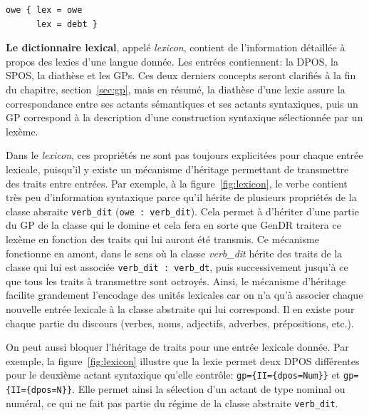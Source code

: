 \begin{lstlisting}[language=mate, caption=Échantillon du \emph{semanticon}, label=fig:semanticon]
owe { lex = owe
      lex = debt }
\end{lstlisting}

\textbf{Le dictionnaire lexical}, appelé \emph{lexicon}, contient de l'information détaillée à propos des lexies d'une langue donnée. Les entrées contiennent: la \ac{DPOS}, la \ac{SPOS}, la diathèse et les \acp{GP}. Ces deux derniers concepts seront clarifiés à la fin du chapitre, section~\ref{sec:gp}, mais en résumé, la diathèse d'une lexie assure la correspondance entre ses actants sémantiques et ses actants syntaxiques, puis un \ac{GP} correspond à la description d'une construction syntaxique sélectionnée par un lexème.

Dans le \emph{lexicon}, ces propriétés ne sont pas toujours explicitées pour chaque entrée lexicale, puisqu'il y existe un mécanisme d'héritage permettant de transmettre des traits entre entrées. Par exemple, à la figure~\ref{fig:lexicon}, le verbe  contient très peu d'information syntaxique parce qu'il hérite de plusieurs propriétés de la classe absraite \texttt{verb\_dit} (\lstinline|owe : verb_dit|). Cela permet à  d'hériter d'une partie du \ac{GP} de la classe qui le domine et cela fera en sorte que GenDR traitera ce lexème en fonction des traits qui lui auront été transmis. Ce mécanisme fonctionne en amont, dans le sens où la classe \emph{verb\_dit} hérite des traits de la classe qui lui est associée \lstinline|verb_dit : verb_dt|, puis successivement jusqu'à ce que tous les traits à transmettre sont octroyés. Ainsi, le mécanisme d'héritage facilite grandement l'encodage des unités lexicales car on n'a qu'à associer chaque nouvelle entrée lexicale à la classe abstraite qui lui correspond. Il en existe pour chaque partie du discours (verbes, noms, adjectifs, adverbes, prépositions, etc.).

On peut aussi bloquer l'héritage de traits pour une entrée lexicale donnée. Par exemple, la figure~\ref{fig:lexicon} illustre que la lexie  permet deux \ac{DPOS} différentes pour le deuxième actant syntaxique qu'elle contrôle: \lstinline!gp={II={dpos=Num}}! et \lstinline!gp={II={dpos=N}}!. Elle permet ainsi la sélection d'un actant de type nominal ou numéral, ce qui ne fait pas partie du régime de la classe abstraite \texttt{verb\_dit}.

